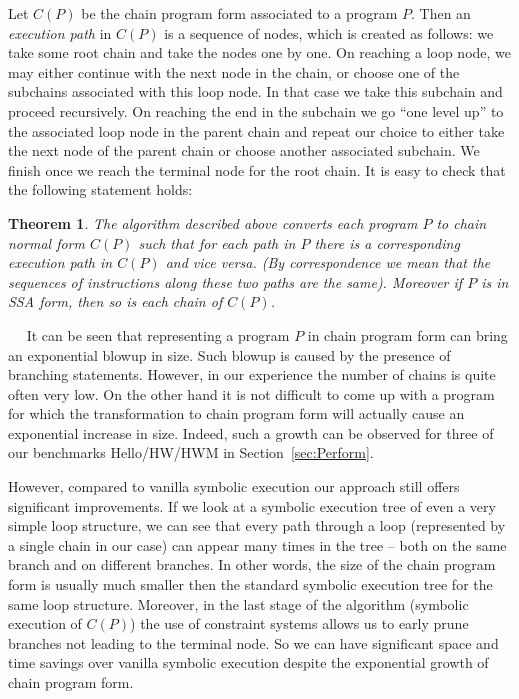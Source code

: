 \documentclass{llncs}
\newtheorem{thm}{Theorem}
\renewcommand{\paragraph}[1]{\vspace{0.2cm}\noindent{\bf #1}~~}
\begin{document}
Let $C(P)$ be the chain program form associated to a program $P$. Then an
\emph{execution path} in $C(P)$ is a sequence of nodes, which is created as follows:
we take some root chain and take the nodes one by one. On reaching a loop
node, we may either continue with the next node in the chain, or choose one
of the subchains associated with this loop node. In that case we take this
subchain and proceed recursively. On reaching the end in the
subchain we go ``one level up'' to the associated loop node in the parent
chain and repeat our choice to either take the next node of the parent
chain or choose another associated subchain. We finish once we reach the
terminal node for the root chain. It is easy to check that the following
statement holds:

\begin{thm} 
  The algorithm described above converts each program $P$ to chain normal
  form $C(P)$ such that for each path in $P$ there is a corresponding execution path in
  $C(P)$ and vice versa. (By correspondence we mean that the sequences of
  instructions along these two paths are the same).  Moreover if $P$ is in
  SSA form, then so is each chain of $C(P)$.
\end{thm}

\paragraph{Exponential growth of chain program form}
It can be seen that representing a program $P$ in chain program form can
bring an exponential blowup in size. Such blowup is caused by the presence
of branching statements. However, in our experience 
the number of chains is quite often very low. 
On the other hand it is not difficult to come up with a program for which the
transformation to chain program form will actually cause an exponential increase in
size. Indeed, such a growth can be observed for three of our benchmarks
Hello/HW/HWM in Section~\ref{sec:Perform}.

However, compared to vanilla symbolic execution our approach still offers significant
improvements. If we look at a symbolic execution tree of even a
very simple loop structure, we can see that every path through a loop
(represented by a single chain in our case) can appear many times in the tree -- both on
the same branch and on different branches. In other words, the size of the
chain program form is usually much smaller then the standard symbolic execution
tree for the same loop structure. Moreover, in the last stage of the
algorithm (symbolic execution of $C(P)$) the use of constraint systems
allows us to early prune branches not leading to the terminal node. So we
can have significant space and time savings over vanilla symbolic execution despite
the exponential growth of chain program form.
\end{document}
